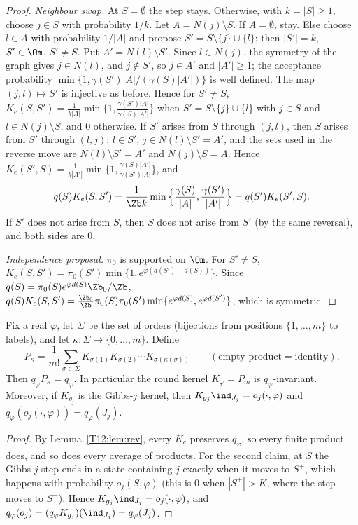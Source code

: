 \documentclass[11pt]{report}
\begin{document}
\begin{proof}
\emph{Neighbour swap.} At $S=\emptyset$ the step stays. Otherwise, with $k=|S|\ge1$, choose $j\in S$ with probability $1/k$. Let $A=N(j)\setminus S$. If $A=\emptyset$, stay. Else choose $l\in A$ with probability $1/|A|$ and propose $S'=S\setminus\{j\}\cup\{l\}$; then $|S'|=k$, $S'\in\Om$, $S'\ne S$. Put $A'=N(l)\setminus S'$. Since $l\in N(j)$, the symmetry of the graph gives $j\in N(l)$, and $j\notin S'$, so $j\in A'$ and $|A'|\ge1$; the acceptance probability $\min\{1,\gamma(S')|A|/(\gamma(S)|A'|)\}$ is well defined. The map $(j,l)\mapsto S'$ is injective as before. Hence for $S'\neq S$, $K_e(S,S')=\frac1{k|A|}\min\{1,\frac{\gamma(S')|A|}{\gamma(S)|A'|}\}$ when $S'=S\setminus\{j\}\cup\{l\}$ with $j\in S$ and $l\in N(j)\setminus S$, and $0$ otherwise. If $S'$ arises from $S$ through $(j,l)$, then $S$ arises from $S'$ through $(l,j)$: $l\in S'$, $j\in N(l)\setminus S'=A'$, and the sets used in the reverse move are $N(l)\setminus S'=A'$ and $N(j)\setminus S=A$. Hence $K_e(S',S)=\frac1{k|A'|}\min\{1,\frac{\gamma(S)|A'|}{\gamma(S')|A|}\}$, and
\[ q(S)K_e(S,S')=\frac{1}{\Zb k}\min\Big\{\frac{\gamma(S)}{|A|},\frac{\gamma(S')}{|A'|}\Big\}=q(S')K_e(S',S). \]
If $S'$ does not arise from $S$, then $S$ does not arise from $S'$ (by the same reversal), and both sides are $0$.

\emph{Independence proposal.} $\pi_0$ is supported on $\Om$. For $S'\ne S$, $K_e(S,S')=\pi_0(S')\min\{1,e^{\varphi(d(S')-d(S))}\}$. Since $q(S)=\pi_0(S)e^{\varphi d(S)}\Zb_0/\Zb$,
$q(S)K_e(S,S')=\frac{\Zb_0}{\Zb}\pi_0(S)\pi_0(S')\min\{e^{\varphi d(S)},e^{\varphi d(S')}\}$, which is symmetric.
\end{proof}

\begin{T12lemma}\label{T12:lem:prefix}
Fix a real $\varphi$, let $\Sigma$ be the set of orders (bijections from positions $\{1,\dots,m\}$ to labels), and let $\kappa:\Sigma\to\{0,\dots,m\}$. Define
\[ P_\kappa=\frac1{m!}\sum_{\sigma\in\Sigma}K_{\sigma(1)}K_{\sigma(2)}\cdots K_{\sigma(\kappa(\sigma))}\qquad(\text{empty product}=\text{identity}). \]
Then $q_\varphi P_\kappa=q_\varphi$. In particular the round kernel $K_\varphi=P_m$ is $q_\varphi$-invariant. Moreover, if $K_{g_j}$ is the Gibbs-$j$ kernel, then $K_{g_j}\ind_{J_j}=o_j(\cdot,\varphi)$ and $q_\varphi(o_j(\cdot,\varphi))=q_\varphi(J_j)$.
\end{T12lemma}
\begin{proof}
By Lemma~\ref{T12:lem:rev}, every $K_e$ preserves $q_\varphi$, so every finite product does, and so does every average of products. For the second claim, at $S$ the Gibbs-$j$ step ends in a state containing $j$ exactly when it moves to $S^+$, which happens with probability $o_j(S,\varphi)$ (this is $0$ when $|S^+|>K$, where the step moves to $S^-$). Hence $K_{g_j}\ind_{J_j}=o_j(\cdot,\varphi)$, and $q_\varphi(o_j)=(q_\varphi K_{g_j})(\ind_{J_j})=q_\varphi(J_j)$.
\end{proof}
\end{document}
